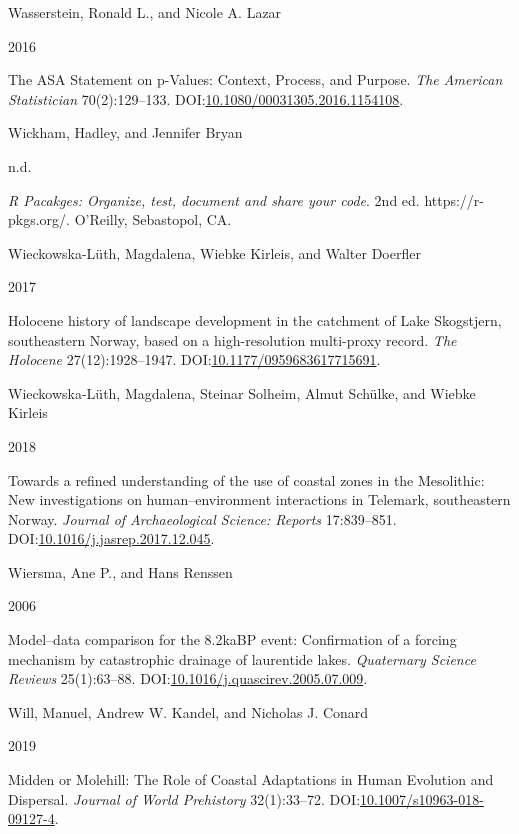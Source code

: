 \documentclass[
  12pt,
  a4paper,
  oneside]{book}
\newlength{\cslhangindent}
\newlength{\csllabelwidth}
\newlength{\cslentryspacingunit} %
\newenvironment{CSLReferences}[2] %
 {%
  \setlength{\parindent}{0pt}
  \ifodd #1
  \let\oldpar\par
  \def\par{\hangindent=\cslhangindent\oldpar}
  \fi
  \setlength{\parskip}{#2\cslentryspacingunit}
 }%
 {}
\newcommand{\CSLBlock}[1]{#1\hfill\break}
\newcommand{\CSLLeftMargin}[1]{\parbox[t]{\csllabelwidth}{#1}}
\newcommand{\CSLRightInline}[1]{\parbox[t]{\linewidth - \csllabelwidth}{#1}\break}
\begin{document}
\begin{CSLReferences}{0}{0}
\leavevmode{}%
\CSLBlock{Wasserstein, Ronald L., and Nicole A. Lazar}
\CSLLeftMargin{ 2016}
\CSLRightInline{{The ASA Statement on p-Values: Context, Process, and Purpose}. \emph{The American Statistician} 70(2):129--133. DOI:\href{https://doi.org/10.1080/00031305.2016.1154108}{10.1080/00031305.2016.1154108}.}

\leavevmode{}%
\CSLBlock{Wickham, Hadley, and Jennifer Bryan}
\CSLLeftMargin{ n.d.}
\CSLRightInline{\emph{{R Pacakges: Organize, test, document and share your code}}. 2nd ed. {https://r-pkgs.org/}. O'Reilly, Sebastopol, CA.}

\leavevmode{}%
\CSLBlock{Wieckowska-Lüth, Magdalena, Wiebke Kirleis, and Walter Doerfler}
\CSLLeftMargin{ 2017}
\CSLRightInline{{Holocene history of landscape development in the catchment of Lake Skogstjern, southeastern Norway, based on a high-resolution multi-proxy record}. \emph{The Holocene} 27(12):1928--1947. DOI:\href{https://doi.org/10.1177/0959683617715691}{10.1177/0959683617715691}.}

\leavevmode{}%
\CSLBlock{Wieckowska-Lüth, Magdalena, Steinar Solheim, Almut Schülke, and Wiebke Kirleis}
\CSLLeftMargin{ 2018}
\CSLRightInline{{Towards a refined understanding of the use of coastal zones in the Mesolithic: New investigations on human--environment interactions in Telemark, southeastern Norway}. \emph{Journal of Archaeological Science: Reports} 17:839--851. DOI:\href{https://doi.org/10.1016/j.jasrep.2017.12.045}{10.1016/j.jasrep.2017.12.045}.}

\leavevmode{}%
\CSLBlock{Wiersma, Ane P., and Hans Renssen}
\CSLLeftMargin{ 2006}
\CSLRightInline{Model--data comparison for the 8.2kaBP event: Confirmation of a forcing mechanism by catastrophic drainage of laurentide lakes. \emph{Quaternary Science Reviews} 25(1):63--88. DOI:\href{https://doi.org/10.1016/j.quascirev.2005.07.009}{10.1016/j.quascirev.2005.07.009}.}

\leavevmode{}%
\CSLBlock{Will, Manuel, Andrew W. Kandel, and Nicholas J. Conard}
\CSLLeftMargin{ 2019}
\CSLRightInline{Midden or Molehill: The Role of Coastal Adaptations in Human Evolution and Dispersal. \emph{Journal of World Prehistory} 32(1):33--72. DOI:\href{https://doi.org/10.1007/s10963-018-09127-4}{10.1007/s10963-018-09127-4}.}


\end{CSLReferences}
\end{document}
